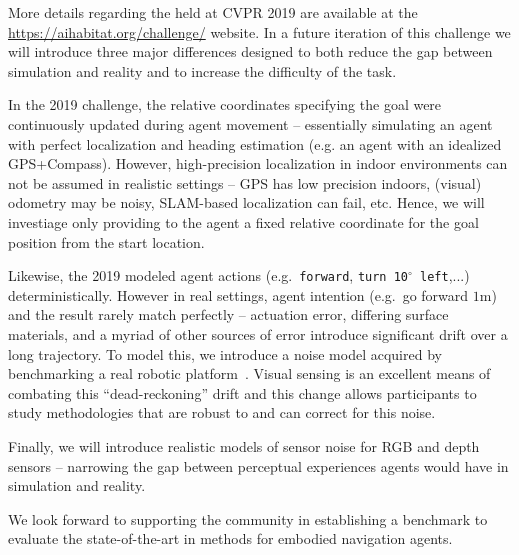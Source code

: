 More details regarding the \habitatchal held at CVPR 2019 are available at the \url{https://aihabitat.org/challenge/} website.
In a future iteration of this challenge we will introduce three major differences designed to both reduce the gap between simulation and reality and to increase the difficulty of the task.
\begin{compactitem}[--]
  \item In the 2019 challenge, the relative coordinates specifying the goal were continuously updated during agent movement -- essentially simulating an agent with perfect localization and heading estimation (e.g. an agent with an idealized GPS+Compass). However, high-precision localization in indoor environments can not be assumed in realistic settings -- GPS has low precision indoors, (visual) odometry may be noisy, SLAM-based localization can fail, etc. Hence, we will investiage only providing to the agent a fixed relative coordinate for the goal position from the start location. \\[-7pt]
  \item Likewise, the 2019 \habitatchal modeled agent actions (e.g.~\texttt{forward}, \texttt{turn 10$^\circ$ left},...) deterministically. However in real settings, agent intention (e.g.~go forward $1\text{m}$) and the result rarely match perfectly -- actuation error, differing surface materials, and a myriad of other sources of error introduce significant drift over a long trajectory. To model this, we introduce a noise model acquired by benchmarking a real robotic platform~\cite{pyrobot2019}. Visual sensing is an excellent means of combating this ``dead-reckoning'' drift and this change allows participants to study methodologies that are robust to and can correct for this noise.\\[-7pt]
  \item Finally, we will introduce realistic models of sensor noise for RGB and depth sensors -- narrowing the gap between perceptual experiences agents would have in simulation and reality.
\end{compactitem}

We look forward to supporting the community in establishing a benchmark to evaluate the state-of-the-art in methods for embodied navigation agents.
